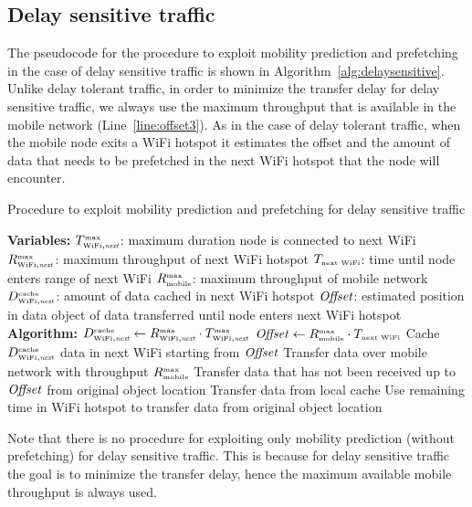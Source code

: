 \documentclass{sig-alternate}
\begin{document}
\subsection{Delay sensitive traffic}

The pseudocode for the procedure to exploit mobility prediction and prefetching in the case of delay sensitive traffic is shown in Algorithm~\ref{alg:delaysensitive}.
Unlike delay tolerant traffic, in order to minimize the transfer delay for delay sensitive traffic, we always use the maximum throughput that is available in the mobile network (Line~\ref{line:offset3}).
As in the case of delay tolerant traffic, when  the mobile node exits a WiFi hotspot it estimates the offset and the amount of data that needs to be prefetched in the next WiFi hotspot that the node will encounter.

\begin{algorithm}
\caption{Procedure to exploit mobility prediction and prefetching for delay sensitive traffic}
\begin{algorithmic}[1]
\label{alg:delaysensitive}
{\scriptsize
\STATE \textbf{Variables:}
\STATE $T^{\mbox{{\tiny max}}}_{\mbox{{\tiny WiFi}}, \mbox{\emph {\tiny next}}}$: maximum duration node is connected  to next WiFi
\STATE $R^{\mbox{{\tiny max}}}_{\mbox{{\tiny WiFi}}, \mbox{\emph {\tiny next}}}$: maximum throughput of next WiFi hotspot
\STATE $T_{{\mbox{\tiny  next WiFi}}}$: time until node enters range of next WiFi
\STATE $R^{\mbox{{\tiny max}}}_{\mbox{{\tiny mobile}}}$: maximum throughput of mobile network
\STATE $D^{\mbox{{\tiny cache}}}_{\mbox{{\tiny WiFi}}, \mbox{\emph {\tiny next}}}$: amount of data cached  in next WiFi hotspot
\STATE $\mbox{\emph {Offset}}$: estimated position in data object of data transferred until node enters next WiFi hotspot
\STATE \textbf{Algorithm:}
\STATE $D^{\mbox{{\tiny cache}}}_{\mbox{{\tiny WiFi}}, \mbox{\emph {\tiny next}}} \leftarrow  R^{\mbox{{\tiny max}}}_{\mbox{{\tiny WiFi}}, \mbox{\emph {\tiny next}}} \cdot T^{\mbox{{\tiny max}}}_{\mbox{{\tiny WiFi}}, \mbox{\emph {\tiny next}}}$
\STATE $\mbox{\emph {Offset}} \leftarrow  R^{\mbox{{\tiny max}}}_{\mbox{{\tiny mobile}}} \cdot T_{ {\mbox{\tiny  next WiFi}}}$ \label{line:offset3}
\STATE Cache $D^{\mbox{{\tiny cache}}}_{\mbox{{\tiny WiFi}}, \mbox{\emph {\tiny next}}}$ data in next WiFi starting from $\mbox{\emph {Offset}}$
\STATE Transfer data over mobile network with throughput $R^{\mbox{{\tiny max}}}_{\mbox{{\tiny mobile}}}$
\STATE Transfer data that has not been received up to $\mbox{\emph {Offset}}$ from original object location
\STATE Transfer data from  local cache
\STATE Use remaining time in WiFi hotspot to transfer data from original object location
\ENDIF
\label{line:2end}
\\ }
\end{algorithmic}
\end{algorithm}


Note that there is no procedure for exploiting only mobility prediction (without prefetching) for delay sensitive traffic. This is because for delay sensitive traffic the goal is to minimize the transfer delay, hence the maximum available mobile throughput is always used.
\end{document}
